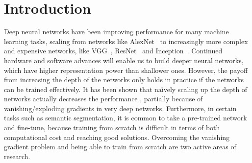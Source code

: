 \documentclass{article}
\newcommand{\logdense}{Log-DenseNet\xspace}
\newcommand{\naive}{na\"{\i}ve\xspace}
\newcommand{\naiive}{\naive}
\begin{document}
\begin{abstract}

\end{abstract}

\section{Introduction}

Deep neural networks have been improving performance for many machine learning tasks, scaling from networks like AlexNet~\citep{alexnet} to increasingly more complex and expensive networks, like VGG~\citep{vggnet}, ResNet~\citep{resnet} and Inception~\citep{inception_v4}.  Continued hardware and software advances will enable us to build deeper neural networks, which have higher representation power than shallower ones. %
However, the payoff from increasing the depth of the networks only holds in practice if the networks can be trained effectively. 
It has been shown that {\naive}ly scaling up the depth of networks actually decreases the performance \citep{resnet}, partially because of vanishing/exploding gradients in very deep networks. 
Furthermore, in certain tasks such as semantic segmentation, it is common to take a pre-trained network and fine-tune, because training from scratch is difficult in terms of both computational cost and reaching good solutions. Overcoming the vanishing gradient problem and being able to train from scratch are two active areas of research.
\end{document}
